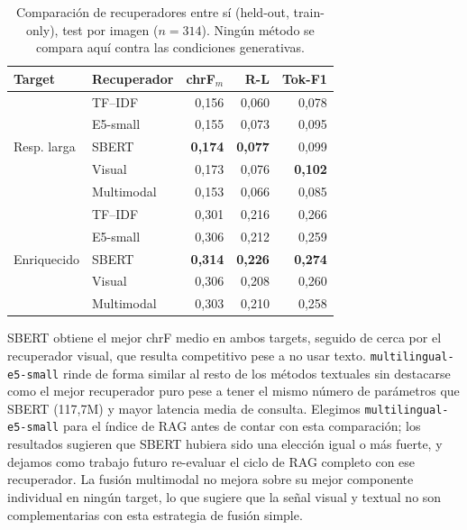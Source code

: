 \documentclass[11pt]{article}
\begin{document}
\begin{table}[t]
\centering
\scriptsize
\setlength{\tabcolsep}{3pt}
\begin{tabular}{llrrr}
\toprule
Target & Recuperador & chrF$_m$ & R-L & Tok-F1 \\
\midrule
\multirow{5}{*}{Resp. larga}
 & TF--IDF & 0,156 & 0,060 & 0,078 \\
 & E5-small & 0,155 & 0,073 & 0,095 \\
 & SBERT & \textbf{0,174} & \textbf{0,077} & 0,099 \\
 & Visual & 0,173 & 0,076 & \textbf{0,102} \\
 & Multimodal & 0,153 & 0,066 & 0,085 \\
\midrule
\multirow{5}{*}{Enriquecido}
 & TF--IDF & 0,301 & 0,216 & 0,266 \\
 & E5-small & 0,306 & 0,212 & 0,259 \\
 & SBERT & \textbf{0,314} & \textbf{0,226} & \textbf{0,274} \\
 & Visual & 0,306 & 0,208 & 0,260 \\
 & Multimodal & 0,303 & 0,210 & 0,258 \\
\bottomrule
\end{tabular}
\caption{Comparación de recuperadores entre sí (held-out, train-only), test por imagen ($n=314$). Ningún método se compara aquí contra las condiciones generativas.}
\label{tab:retrieval}
\end{table}

SBERT obtiene el mejor chrF medio en ambos targets, seguido de cerca por el recuperador visual, que resulta competitivo pese a no usar texto. \texttt{multilingual-e5-small} rinde de forma similar al resto de los métodos textuales sin destacarse como el mejor recuperador puro pese a tener el mismo número de parámetros que SBERT (117,7M) y mayor latencia media de consulta. Elegimos \texttt{multilingual-e5-small} para el índice de RAG antes de contar con esta comparación; los resultados sugieren que SBERT hubiera sido una elección igual o más fuerte, y dejamos como trabajo futuro re-evaluar el ciclo de RAG completo con ese recuperador. La fusión multimodal no mejora sobre su mejor componente individual en ningún target, lo que sugiere que la señal visual y textual no son complementarias con esta estrategia de fusión simple.
\end{document}
